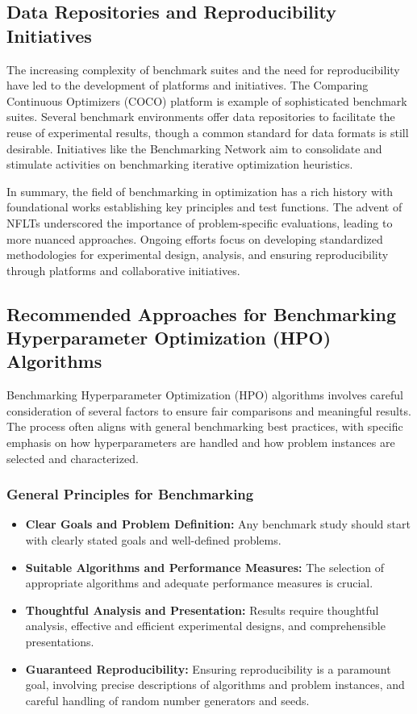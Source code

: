 \subsection{Data Repositories and Reproducibility Initiatives}

The increasing complexity of benchmark suites and the need for reproducibility have led to the development of platforms and initiatives. The Comparing Continuous Optimizers (COCO) platform \citep{Hansen2016b} is example of sophisticated benchmark suites. Several benchmark environments offer data repositories to facilitate the reuse of experimental results, though a common standard for data formats is still desirable. Initiatives like the Benchmarking Network aim to consolidate and stimulate activities on benchmarking iterative optimization heuristics.

In summary, the field of benchmarking in optimization has a rich history with foundational works establishing key principles and test functions. The advent of NFLTs underscored the importance of problem-specific evaluations, leading to more nuanced approaches. Ongoing efforts focus on developing standardized methodologies for experimental design, analysis, and ensuring reproducibility through platforms and collaborative initiatives.

\subsection{Recommended Approaches for Benchmarking Hyperparameter Optimization (HPO) Algorithms}

Benchmarking Hyperparameter Optimization (HPO) algorithms involves careful consideration of several factors to ensure fair comparisons and meaningful results. The process often aligns with general benchmarking best practices, with specific emphasis on how hyperparameters are handled and how problem instances are selected and characterized.

\subsubsection{General Principles for Benchmarking}

\begin{itemize}[leftmargin=*,itemsep=0.4em]
  \item \textbf{Clear Goals and Problem Definition:} Any benchmark study should start with clearly stated goals and well-defined problems.
  \item \textbf{Suitable Algorithms and Performance Measures:} The selection of appropriate algorithms and adequate performance measures is crucial.
  \item \textbf{Thoughtful Analysis and Presentation:} Results require thoughtful analysis, effective and efficient experimental designs, and comprehensible presentations.
  \item \textbf{Guaranteed Reproducibility:} Ensuring reproducibility is a paramount goal, involving precise descriptions of algorithms and problem instances, and careful handling of random number generators and seeds.
\end{itemize}

